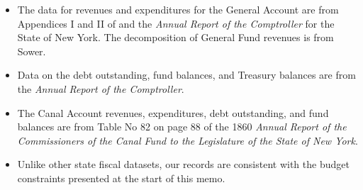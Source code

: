 \documentclass[11pt]{article}
\begin{document}
\begin{itemize}

\item The data for revenues and expenditures for the General Account are from Appendices I and II of \cite{Sowers_1914} and the 
{\em Annual Report of the Comptroller} for the State of New York.  The decomposition of General Fund revenues is from Sower.  

\item Data on the debt outstanding, fund balances, and Treasury balances are from the {\em Annual Report of the Comptroller}.

\item The Canal Account revenues, expenditures, debt outstanding, and fund balances are from Table No 82 on page 88 of the 1860
{\em Annual Report of the Commissioners of the Canal Fund to the Legislature of the State of New York}.

\item Unlike other state fiscal datasets, our records are consistent with the budget constraints presented at the start of this memo.

\end{itemize}


\clearpage

\end{document}
